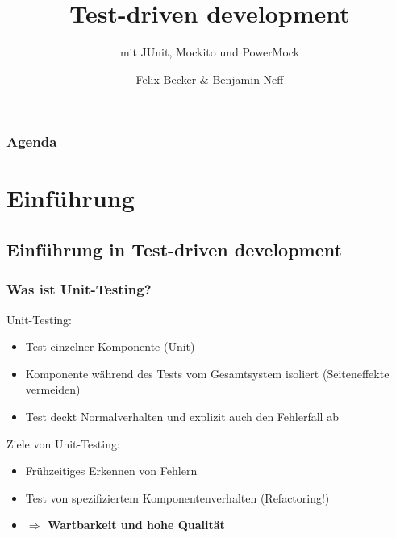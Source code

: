 \documentclass{beamer}
\title{Test-driven development}
\subtitle{mit JUnit, Mockito und PowerMock}
\institute[TD 2k11]{Computerseminar Tondorf 2011}
\author[F. Becker, B. Neff]{
        Felix Becker \&
	Benjamin Neff
}
\begin{document}
	\begin{frame}
		\titlepage
	\end{frame}

	\begin{frame}
		\frametitle{Agenda}
		\setcounter{tocdepth}{1}
		\tableofcontents
	\end{frame}
	

	\logo{}
	\section{Einführung}
	
		\subsection{Einführung in Test-driven development}

			\begin{frame}
				\frametitle{Was ist Unit-Testing?}

				Unit-Testing:
				\begin{itemize}
					\item{Test einzelner Komponente (Unit)}
					\item{Komponente während des Tests vom Gesamtsystem isoliert (Seiteneffekte vermeiden)}
					\item{Test deckt Normalverhalten und explizit auch den Fehlerfall ab}
				\end{itemize}
				\pause
				Ziele von Unit-Testing:
				\begin{itemize}
					\item{Frühzeitiges Erkennen von Fehlern}
					\item{Test von spezifiziertem Komponentenverhalten (Refactoring!)}
					\item[]{\color{red}\textbf{$\Rightarrow$ Wartbarkeit und hohe Qualität}}
				\end{itemize}
				
			\end{frame}
\end{document}
